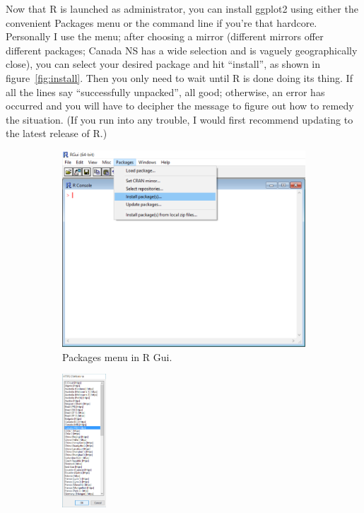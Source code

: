 \documentclass{report}
\newcommand{\code}[1]{\textsf{\ttfamily #1}}
\begin{document}
	Now that R is launched as administrator, you can install \code{ggplot2} using either the convenient Packages menu or the command line if you're that hardcore. Personally I use the menu; after choosing a mirror (different mirrors offer different packages; Canada NS has a wide selection and is vaguely geographically close), you can select your desired package and hit ``install'', as shown in figure~\ref{fig:install}. Then you only need to wait until R is done doing its thing. If all the lines say ``successfully unpacked'', all good; otherwise, an error has occurred and you will have to decipher the message to figure out how to remedy the situation. (If you run into any trouble, I would first recommend updating to the latest release of R.)
	\begin{figure}[h]
		\centering
		\begin{subfigure}[b]{0.475\textwidth}
			\centering
			\includegraphics[width=\textwidth]{menu.png}
			\caption{Packages menu in R Gui.}
			\label{fig:menu}
		\end{subfigure}
		\hfill
		\begin{subfigure}[b]{0.475\textwidth}
			\centering
			\includegraphics[height=5cm]{mirror.png}

\end{subfigure}
\end{figure}
\end{document}
